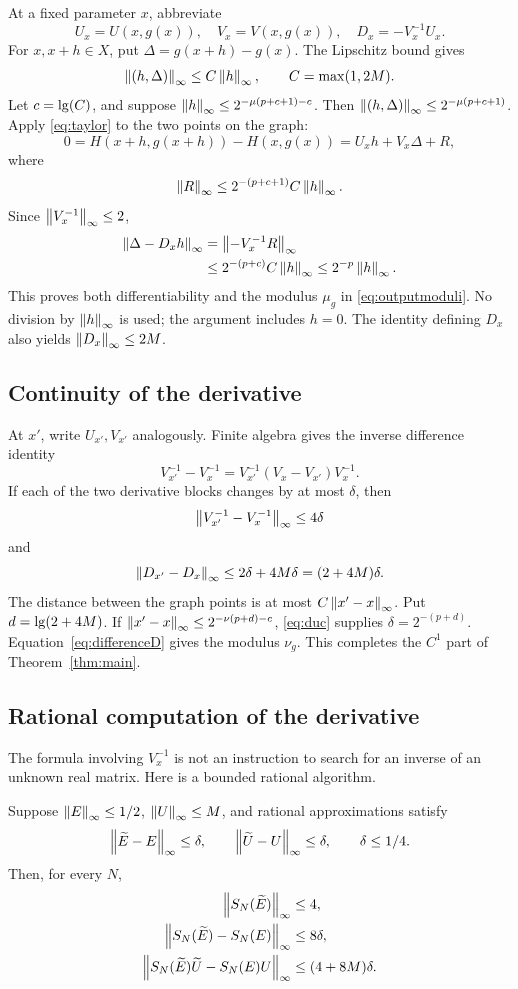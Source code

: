 At a fixed parameter \(x\), abbreviate
\[
 U_x=U(x,g(x)),\quad V_x=V(x,g(x)),\quad
 D_x=-V_x^{-1}U_x.
\]
For \(x,x+h\in X\), put
\(\Delta=g(x+h)-g(x)\). The Lipschitz bound gives
\[
 \left\lVert(h,\Delta)\right\rVert_\infty
 \le C\left\lVert h\right\rVert_\infty,\qquad C=\max(1,2M).
\]
Let \(c=\operatorname{lg}(C)\), and suppose
\(\left\lVert h\right\rVert_\infty\le2^{-\mu(p+c+1)-c}\).
Then \(\left\lVert(h,\Delta)\right\rVert_\infty\le2^{-\mu(p+c+1)}\).
Apply \eqref{eq:taylor} to the two points on the graph:
\[
 0=H(x+h,g(x+h))-H(x,g(x))
   =U_xh+V_x\Delta+R,
\]
where
\[
 \left\lVert R\right\rVert_\infty\le2^{-(p+c+1)}C\left\lVert h\right\rVert_\infty.
\]
Since \(\left\lVert V_x^{-1}\right\rVert_\infty\le2\),
\begin{align*}
 \left\lVert\Delta-D_xh\right\rVert_\infty
 &=\left\lVert-V_x^{-1}R\right\rVert_\infty\\
 &\le 2^{-(p+c)}C\left\lVert h\right\rVert_\infty
 \le2^{-p}\left\lVert h\right\rVert_\infty.
\end{align*}
This proves both differentiability and the modulus \(\mu_g\) in
\eqref{eq:outputmoduli}. No division by \(\left\lVert h\right\rVert_\infty\) is used;
the argument includes \(h=0\).
The identity defining \(D_x\) also yields \(\left\lVert D_x\right\rVert_\infty\le2M\).

\subsection{Continuity of the derivative}

At \(x'\), write \(U_{x'},V_{x'}\) analogously.
Finite algebra gives the inverse difference identity
\[
 V_{x'}^{-1}-V_x^{-1}
   =V_{x'}^{-1}(V_x-V_{x'})V_x^{-1}.
\]
If each of the two derivative blocks changes by at most \(\delta\),
then
\[
 \left\lVert V_{x'}^{-1}-V_x^{-1}\right\rVert_\infty\le4\delta
\]
and
\begin{equation}\label{eq:differenceD}
 \left\lVert D_{x'}-D_x\right\rVert_\infty
 \le 2\delta+4M\delta=(2+4M)\delta.
\end{equation}
The distance between the graph points is at most
\(C\left\lVert x'-x\right\rVert_\infty\). Put \(d=\operatorname{lg}(2+4M)\).
If \(\left\lVert x'-x\right\rVert_\infty\le2^{-\nu(p+d)-c}\),
\eqref{eq:duc} supplies \(\delta=2^{-(p+d)}\).
Equation~\eqref{eq:differenceD} gives the modulus \(\nu_g\).
This completes the \(C^1\) part of Theorem~\ref{thm:main}.

\subsection{Rational computation of the derivative}

The formula involving \(V_x^{-1}\) is not an instruction to
search for an inverse of an unknown real matrix. Here is a
bounded rational algorithm.

\begin{lemma}
\label{lem:perturb}
Suppose \(\left\lVert E\right\rVert_\infty\le1/2\), \(\left\lVert U\right\rVert_\infty\le M\), and rational
approximations satisfy
\[
 \left\lVert\widetilde E-E\right\rVert_\infty\le\delta,\qquad
 \left\lVert\widetilde U-U\right\rVert_\infty\le\delta,\qquad \delta\le1/4.
\]
Then, for every \(N\),
\begin{align}
 \left\lVert S_N(\widetilde E)\right\rVert_\infty&\le4,\label{eq:snorm}\\
 \left\lVert S_N(\widetilde E)-S_N(E)\right\rVert_\infty&\le8\delta,\label{eq:sperturb}\\
 \left\lVert S_N(\widetilde E)\widetilde U-S_N(E)U\right\rVert_\infty
 &\le(4+8M)\delta.\label{eq:productperturb}
\end{align}
\end{lemma}

